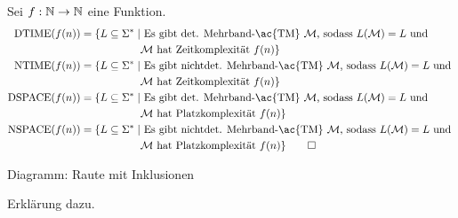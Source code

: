 \begin{Def}[name={[$\NTIME$ Klasse]}]
	Sei $f:\N\->\N$ eine Funktion.
	\begin{align*}
	\DTIME(f(n)) = \{L \subseteq\Sigma^*\mid & \text{ Es gibt det. Mehrband-\ac{TM} $\M$, sodass $L(\M)=L$ und }\\
	                & \text{$\M$ hat Zeitkomplexität $f(n)$} \}\\
    \NTIME(f(n)) = \{L \subseteq\Sigma^*\mid & \text{ Es gibt nichtdet. Mehrband-\ac{TM} $\M$, sodass $L(\M)=L$ und }\\
                    & \text{$\M$ hat Zeitkomplexität $f(n)$} \}\\           
	\DSPACE(f(n)) = \{L \subseteq\Sigma^*\mid & \text{ Es gibt det. Mehrband-\ac{TM} $\M$, sodass $L(\M)=L$ und }\\
	                & \text{$\M$ hat Platzkomplexität $f(n)$} \}\\
    \NSPACE(f(n)) = \{L \subseteq\Sigma^*\mid & \text{ Es gibt nichtdet. Mehrband-\ac{TM} $\M$, sodass $L(\M)=L$ und }\\
                    & \text{$\M$ hat Platzkomplexität $f(n)$} \}\qedhere
    \end{align*}	

\end{Def}

{\color{red}

Diagramm: Raute mit Inklusionen

Erklärung dazu.

% 
% 
% 

}

